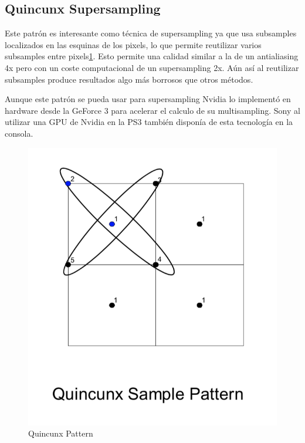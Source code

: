 \documentclass[withindex, glossary]{cam-thesis}
\begin{document}
\subsection{Quincunx Supersampling}

Este patrón es interesante como técnica de supersampling ya que usa subsamples localizados en las esquinas de los pixels, lo que permite reutilizar varios subsamples entre pixels\ref{fig:quincunx}. Esto permite una calidad similar a la de un antialiasing 4x pero con un coste computacional de un supersampling 2x. Aún así al reutilizar subsamples produce resultados algo más borrosos que otros métodos.

Aunque este patrón se pueda usar para supersampling Nvidia lo implementó en hardware desde la GeForce 3\cite{hraa} para acelerar el calculo de su multisampling. Sony al utilizar una GPU de Nvidia en la PS3 también disponía de esta tecnología en la consola.

\begin{figure}[!htb]
    \includegraphics[width=\linewidth]{figures/quincunx.png}
    \caption{Quincunx Pattern\cite{hraa}}
    \label{fig:quincunx}
\end{figure}
\end{document}
